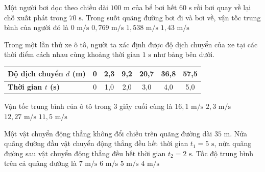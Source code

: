 \begin{vd} Một người bơi dọc theo chiều dài $100\text{ m}$ của bể bơi hết $60\text{ s}$ rồi bơi quay về lại chỗ xuất phát trong $70\text{ s}$. Trong suốt quãng đường bơi đi và bơi về, vận tốc trung bình của người đó là
\choice
{\True $0\text{ m/s}$}
{$0{,}769\text{ m/s}$}
{$1{,}538\text{ m/s}$}
{$1{,}43\text{ m/s}$}
\end{vd}

\begin{vd} Trong một lần thử xe ô tô, người ta xác định được độ dịch chuyển của xe tại các thời điểm cách nhau cùng khoảng thời gian $1\text{ s}$ như bảng bên dưới.
\begin{center}
\renewcommand{\arraystretch}{1.2}
\begin{tabular}{|l|c|c|c|c|c|c|}
\hline
\textbf{Độ dịch chuyển $d$ (m)} & 0 & 2{,}3 & 9{,}2 & 20{,}7 & 36{,}8 & 57{,}5 \\
\hline
\textbf{Thời gian $t$ (s)} & 0 & 1{,}0 & 2{,}0 & 3{,}0 & 4{,}0 & 5{,}0 \\
\hline
\end{tabular}
\end{center}
Vận tốc trung bình của ô tô trong 3 giây cuối cùng là
\choice
{\True $16{,}1\text{ m/s}$}
{$2{,}3\text{ m/s}$}
{$12{,}27\text{ m/s}$}
{$11{,}5\text{ m/s}$}
\end{vd}

\begin{vd} Một vật chuyển động thẳng không đổi chiều trên quãng đường dài $35\text{ m}$. Nửa quãng đường đầu vật chuyển động thẳng đều hết thời gian $t_1 = 5\text{ s}$, nửa quãng đường sau vật chuyển động thẳng đều hết thời gian $t_2 = 2\text{ s}$. Tốc độ trung bình trên cả quãng đường là
\choice
{$7\text{ m/s}$}
{$6\text{ m/s}$}
{\True $5\text{ m/s}$}
{$4\text{ m/s}$}
\end{vd}

